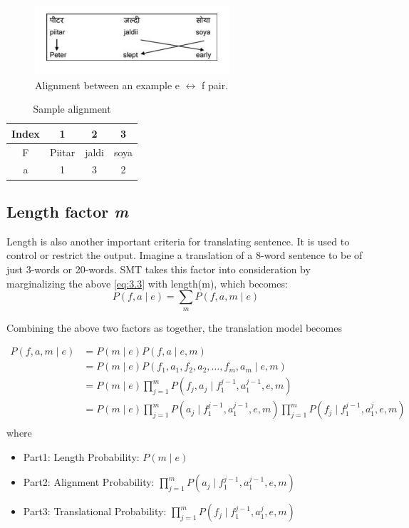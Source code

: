 \begin{figure}
        \centering
        \includegraphics[scale=0.6]{Images/alignment}
        \caption{Alignment between an example e $\leftrightarrow$ f pair.}
        \label{fig:alignment}
\end{figure}



\begin{table}[h!]
\centering
 \caption{Sample alignment} 
 \label{tab:alignment} 
 \begin{tabular}{c c c c} 
 \hline
 Index & 1 & 2 & 3 \\  
 \hline
 F & Piitar & jaldi & soya \\
 a & 1 & 3 & 2 \\ [1ex] 
 \hline
 \end{tabular}
\end{table}

\subsection{Length factor \textit{m}}
Length is also another important criteria for translating sentence. It is used to control or restrict the output. Imagine a translation of a 8-word sentence to be of just 3-words or 20-words. SMT takes this factor into consideration by marginalizing the above \eqref{eq:3.3} with length(m), which becomes:
\begin{equation}
P(f,a\mid e) = \sum_{m}P(f,a,m\mid e)
\end{equation}

Combining the above two factors as together, the translation model becomes\cite{bhattacharyya}


\begin{align*}
P(f,a,m\mid e) &= P(m\mid e)P(f,a\mid e,m) \\
			   &= P(m\mid e)P(f_{1},a_{1},f_{2},a_{2},\ldots,f_{m},a_{m}\mid e,m) \\
               &= P(m\mid e)\prod_{j=1}^{m}P(f_{j},a_{j}\mid f_{1}^{j-1},a_{1}^{j-1},e,m) \\
               &= P(m\mid e)\prod_{j=1}^{m}P(a_{j}\mid f_{1}^{j-1},a_{1}^{j-1},e,m)\prod_{j=1}^{m}P(f_{j}\mid f_{1}^{j-1},a_{1}^{j},e,m) \\ 
\end{align*}
where \\
\begin{itemize}
\item Part1: Length Probability: $P(m\mid e)$ 
\item Part2: Alignment Probability: $\prod_{j=1}^{m}P(a_{j}\mid f_{1}^{j-1},a_{1}^{j-1},e,m)$
\item Part3: Translational Probability: $\prod_{j=1}^{m}P(f_{j}\mid f_{1}^{j-1},a_{1}^{j},e,m)$
\end{itemize}


